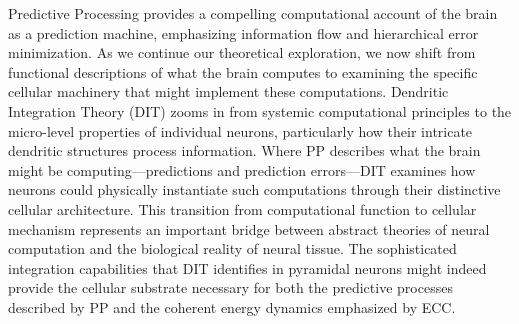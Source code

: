 Predictive Processing provides a compelling computational account of the brain as a prediction machine, emphasizing information flow and hierarchical error minimization. As we continue our theoretical exploration, we now shift from functional descriptions of what the brain computes to examining the specific cellular machinery that might implement these computations. Dendritic Integration Theory (DIT) zooms in from systemic computational principles to the micro-level properties of individual neurons, particularly how their intricate dendritic structures process information. Where PP describes what the brain might be computing—predictions and prediction errors—DIT examines how neurons could physically instantiate such computations through their distinctive cellular architecture. This transition from computational function to cellular mechanism represents an important bridge between abstract theories of neural computation and the biological reality of neural tissue. The sophisticated integration capabilities that DIT identifies in pyramidal neurons might indeed provide the cellular substrate necessary for both the predictive processes described by PP and the coherent energy dynamics emphasized by ECC.
